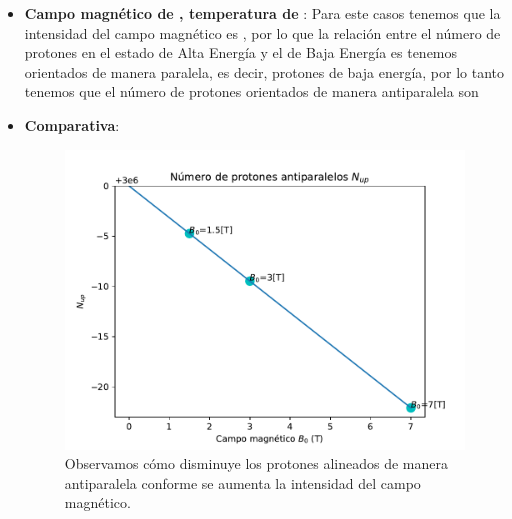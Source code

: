 \begin{itemize}
  \item \textbf{Campo magnético de , temperatura de }:
  Para este casos tenemos que la intensidad del campo magnético es , por lo que la relación entre el número de protones en el estado de Alta Energía y el de Baja Energía es
  tenemos  orientados de manera paralela, es decir,  protones de baja energía, por lo tanto tenemos que el número de protones orientados de manera antiparalela son

  
\pagebreak


\item \textbf{Comparativa}:

\begin{figure}[!ht]
  \center
  \includegraphics[scale=0.8]{./codes/B0_vs_N_up.pdf}
  \caption{Observamos cómo disminuye los protones alineados de manera antiparalela conforme se aumenta la intensidad del campo magnético.}
  \label{fig:c}
  \end{figure}

\end{itemize}










